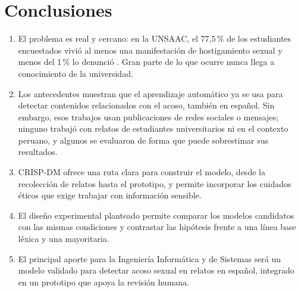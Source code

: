 \chapter*{Conclusiones}

\begin{enumerate}
	\item El problema es real y cercano: en la UNSAAC, el 77,5\,\% de los estudiantes encuestados vivió al menos una manifestación de hostigamiento sexual y menos del 1\,\% lo denunció \citep{gutierrez2022}. Gran parte de lo que ocurre nunca llega a conocimiento de la universidad.
	\item Los antecedentes muestran que el aprendizaje automático ya se usa para detectar contenidos relacionados con el acoso, también en español. Sin embargo, esos trabajos usan publicaciones de redes sociales o mensajes; ninguno trabajó con relatos de estudiantes universitarios ni en el contexto peruano, y algunos se evaluaron de forma que puede sobrestimar sus resultados.
	\item CRISP-DM ofrece una ruta clara para construir el modelo, desde la recolección de relatos hasta el prototipo, y permite incorporar los cuidados éticos que exige trabajar con información sensible.
	\item El diseño experimental planteado permite comparar los modelos candidatos con las mismas condiciones y contrastar las hipótesis frente a una línea base léxica y una mayoritaria.
	\item El principal aporte para la Ingeniería Informática y de Sistemas será un modelo validado para detectar acoso sexual en relatos en español, integrado en un prototipo que apoya la revisión humana.
\end{enumerate}
